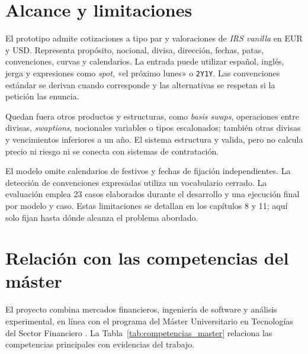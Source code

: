 \section{Alcance y limitaciones}
\label{sec:alcance_limitaciones}

El prototipo admite cotizaciones a tipo par y valoraciones de \textit{IRS vanilla} en EUR y USD. Representa propósito, nocional, divisa, dirección, fechas, patas, convenciones, curvas y calendarios. La entrada puede utilizar español, inglés, jerga y expresiones como \textit{spot}, «el próximo lunes» o \texttt{2Y1Y}. Las convenciones estándar se derivan cuando corresponde y las alternativas se respetan si la petición las enuncia.

Quedan fuera otros productos y estructuras, como \textit{basis swaps}, operaciones entre divisas, \textit{swaptions}, nocionales variables o tipos escalonados; también otras divisas y vencimientos inferiores a un año. El sistema estructura y valida, pero no calcula precio ni riesgo ni se conecta con sistemas de contratación.

El modelo omite calendarios de festivos y fechas de fijación independientes. La detección de convenciones expresadas utiliza un vocabulario cerrado. La evaluación emplea 23 casos elaborados durante el desarrollo y una ejecución final por modelo y caso. Estas limitaciones se detallan en los capítulos 8 y 11; aquí solo fijan hasta dónde alcanza el problema abordado.

\section{Relación con las competencias del máster}
\label{sec:competencias_master}

El proyecto combina mercados financieros, ingeniería de software y análisis experimental, en línea con el programa del Máster Universitario en Tecnologías del Sector Financiero \citep{uc3m2026fintech}. La Tabla~\ref{tab:competencias_master} relaciona las competencias principales con evidencias del trabajo.

